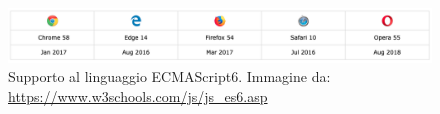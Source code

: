 \begin{figure}[H]
	\begin{center}
		\includegraphics[scale=0.4]{./images/ES6_Support.png}
		 \caption{Supporto al linguaggio ECMAScript6. Immagine da: \url{https://www.w3schools.com/js/js_es6.asp}}
		 \label{SupportoECMAScript}	
	\end{center}
\end{figure}

\pagebreak


